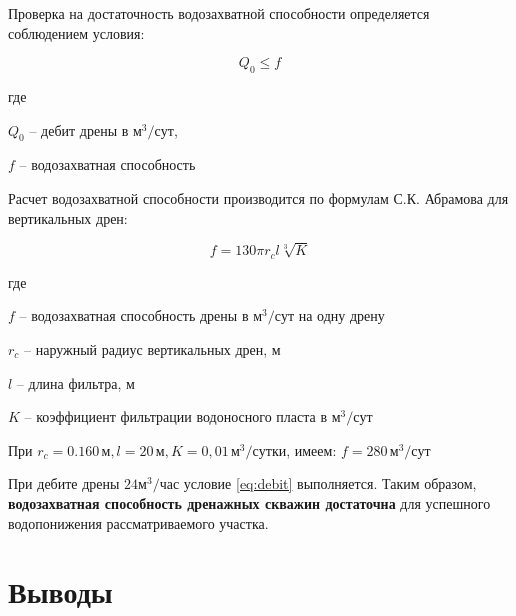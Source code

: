 \documentclass[a4paper,12pt]{article} %
\begin{document}
Проверка на достаточность водозахватной способности определяется соблюдением условия:

\begin{equation}\label{eq:debit}
	Q_0 \leqslant f 
\end{equation}

	где 
	
	$Q_0$ -- дебит дрены в $м^3/сут$, 
	
	$f$ -- водозахватная способность

	\bigskip

Расчет водозахватной способности производится по формулам С.К. Абрамова для вертикальных дрен:

\begin{equation}\label{eq:abramov}
	f = 130 \pi r_c l \sqrt[3]{K}
\end{equation}

	где 

	$f$ -- водозахватная способность дрены в $м^3/сут$ на одну дрену
	
	$r_c$ -- наружный радиус вертикальных дрен, м
	
	$l$ -- длина фильтра, м
	
	$K$ -- коэффициент фильтрации водоносного пласта в $м^3/сут$
	
	\bigskip
	
	При $r_c = 0.160 \, м, l = 20 \, м, K = 0,01 \, м^3/сутки $, имеем: $f = 280 \, м^3 / сут$

	\bigskip
	
При дебите дрены $24 м^3/час$ условие \eqref{eq:debit} выполняется. Таким образом, \textbf{водозахватная способность дренажных скважин достаточна} для успешного водопонижения рассматриваемого участка.

\section{Выводы}
\end{document}

